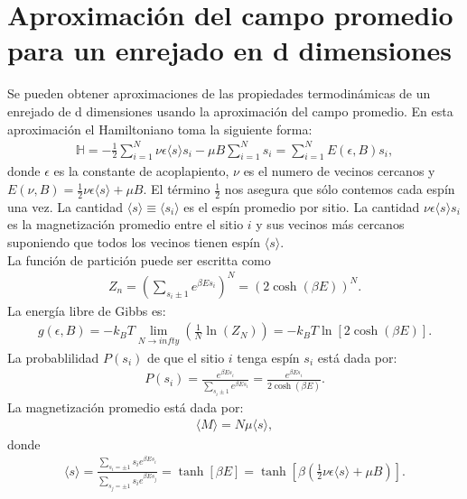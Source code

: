 \documentclass[letterpaper,12pt,oneside]{book}
\begin{document}
\section{Aproximaci\'on del campo promedio para un enrejado en d dimensiones}
Se pueden obtener aproximaciones de las propiedades termodin\'amicas de un enrejado de d dimensiones usando la aproximaci\'on del campo promedio. En esta aproximaci\'on el Hamiltoniano toma la siguiente forma:
%
\begin{eqnarray}
\mathbb{H} = -\frac{1}{2} \sum_{i=1}^N \nu \epsilon \langle s \rangle s_i - \mu B \sum_{i=1}^N s_i = \sum_{i=1}^N E(\epsilon, B)s_i,
\end{eqnarray}
%
donde $\epsilon$ es la constante de acoplapiento, $\nu$ es el numero de vecinos cercanos y $E( \nu , B) = \frac{1}{2}\nu \epsilon \langle s \rangle + \mu B$. El t\'ermino $\frac{1}{2}$ nos asegura que s\'olo contemos cada esp\'in una vez. La cantidad $\langle s \rangle \equiv \langle s_i \rangle$ es el esp\'in promedio por sitio. La cantidad $\nu \epsilon \langle s \rangle s_i$ es la magnetizaci\'on promedio entre el sitio $i$ y sus vecinos m\'as cercanos suponiendo que todos los vecinos tienen esp\'in $\langle s \rangle$. \\
La funci\'on de partici\'on puede ser escritta como 
%
\begin{eqnarray}
Z_n = \left (\sum_{s_i \pm 1} e^{\beta E s_i}\right)^N  = (2 \cosh (\beta E))^N.
\end{eqnarray}
%
La energ\'ia libre de Gibbs es:
%
\begin{eqnarray}
g(\epsilon, B)= -k_B T \lim_{N \to infty} \left(\frac{1}{N} \ln(Z_N) \right) = -k_B T \ln[2 \cosh (\beta E)].
\end{eqnarray}
%
La probablilidad $P(s_i)$ de que el sitio $i$ tenga esp\'in $s_i$ est\'a dada por:
%
\begin{eqnarray}
P(s_i) = \frac{e^{\beta E s_i}}{\sum_{s_i \pm 1}e^{\beta E s_i}} = \frac{e^{\beta E s_i}}{2\cosh (\beta E)}.
\end{eqnarray}
%
La magnetizaci\'on promedio est\'a dada por:
%
\begin{eqnarray}
\langle M \rangle = N \mu\langle s\rangle,  
\end{eqnarray}
%
donde 
%
\begin{eqnarray}
\langle s \rangle  = \frac{\sum_{s_i=\pm 1}s_i e^{\beta E s_i}}{\sum_{s_j=\pm 1}s_i e^{\beta E s_j}} = \tanh [\beta E] = \tanh \left[\beta\left(\frac{1}{2} \nu \epsilon \langle s \rangle + \mu B \right)\right] \label{espinPromedio}.
\end{eqnarray}
\end{document}
